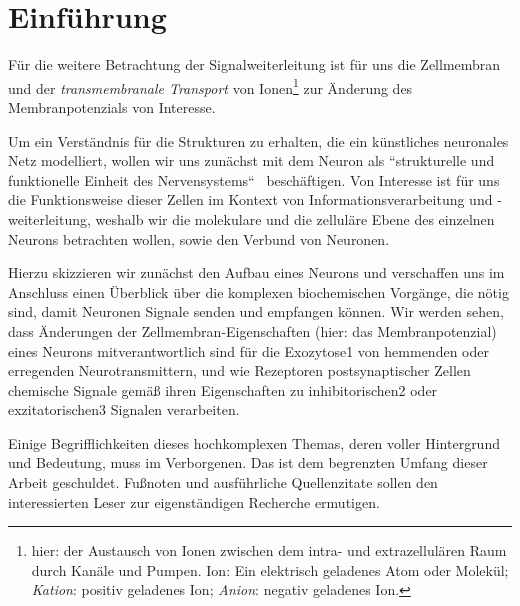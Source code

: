 \chapter{Einführung}

Für die weitere Betrachtung der Signalweiterleitung ist für uns die Zellmembran und der \textit{transmembranale Transport} von Ionen\footnote{
    hier: der Austausch von Ionen zwischen dem intra- und extrazellulären Raum durch Kanäle und Pumpen. Ion: Ein elektrisch geladenes Atom oder Molekül; \textit{Kation}: positiv geladenes Ion; \textit{Anion}: negativ geladenes Ion.
} zur Änderung des Membranpotenzials von Interesse.

Um ein Verständnis für die Strukturen zu erhalten, die ein künstliches neuronales Netz modelliert, wollen wir uns zunächst mit dem Neuron als ``strukturelle und funktionelle Einheit des Nervensystems``~\cite[42]{SD07} beschäftigen.
Von Interesse ist für uns die Funktionsweise dieser Zellen im Kontext von Informationsverarbeitung und -weiterleitung, weshalb wir die molekulare und die zelluläre Ebene des einzelnen Neurons betrachten wollen, sowie den Verbund von Neuronen.

Hierzu skizzieren wir zunächst den Aufbau eines Neurons und verschaffen uns im Anschluss einen Überblick über die komplexen biochemischen Vorgänge, die nötig sind, damit Neuronen Signale senden und empfangen können. Wir werden sehen, dass Änderungen der Zellmembran-Eigenschaften (hier: das Membranpotenzial) eines Neurons mitverantwortlich sind für die Exozytose1 von hemmenden oder erregenden Neurotransmittern, und wie Rezeptoren postsynaptischer Zellen chemische Signale gemäß ihren Eigenschaften zu inhibitorischen2 oder exzitatorischen3 Signalen verarbeiten.

Einige Begrifflichkeiten dieses hochkomplexen Themas, deren voller Hintergrund und Bedeutung, muss im Verborgenen. Das ist dem begrenzten Umfang dieser Arbeit geschuldet. Fußnoten und ausführliche Quellenzitate sollen den interessierten Leser zur eigenständigen Recherche ermutigen.